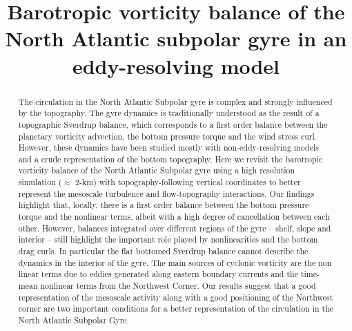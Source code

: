 \documentclass[os, manuscript]{copernicus}
\begin{document}
\title{Barotropic vorticity balance of the North Atlantic subpolar gyre in an eddy-resolving model}











\received{}
\pubdiscuss{} %
\revised{}
\accepted{}
\published{}




\maketitle



\begin{abstract}
The circulation in the North Atlantic Subpolar gyre is complex and strongly influenced by the topography. The gyre dynamics is traditionally understood as the result of a topographic Sverdrup balance, which corresponds to a first order balance between the planetary vorticity advection, the bottom pressure torque and the wind stress curl. However, these dynamics have been studied mostly with non-eddy-resolving models and a crude representation of the bottom topography. Here we revisit the barotropic vorticity balance of the North Atlantic Subpolar gyre using a high resolution simulation ($\approx$ 2-km) with topography-following vertical coordinates to better represent the mesoscale turbulence and flow-topography interactions. Our findings highlight that, locally, there is a first order balance  between the bottom pressure torque and the nonlinear terms, albeit with a high degree of cancellation between each other. However, balances integrated over different regions of the gyre -- shelf, slope and interior -- still highlight the important role played by nonlinearities and the bottom drag curls. In particular the flat bottomed Sverdrup balance cannot describe the dynamics in the interior of the gyre. The main sources of cyclonic vorticity are the non linear terms due to eddies generated along eastern boundary currents and the time-mean nonlinear terms from the Northwest Corner. Our results suggest that a good representation of the mesoscale activity along with a good positioning of the Northwest corner are two important conditions for a better representation of the circulation in the North Atlantic Subpolar Gyre.
\end{abstract}
\end{document}
